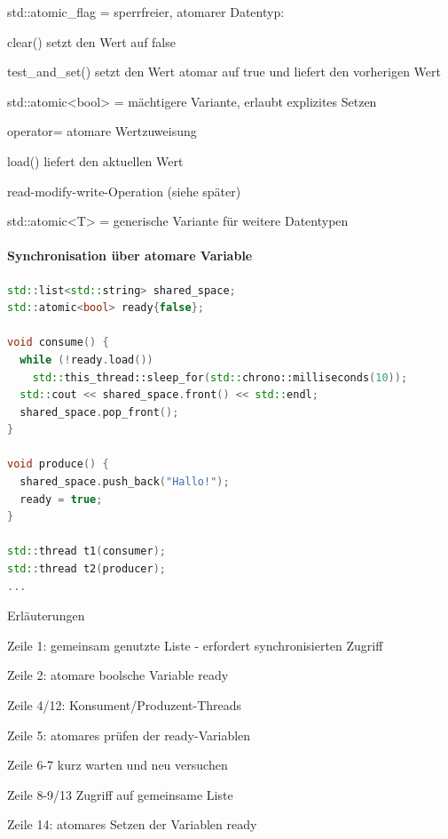 \documentclass[10pt]{article}
\begin{document}
  \begin{itemize*}
    \item std::atomic\_flag = sperrfreier, atomarer Datentyp:
    \begin{itemize*}
      \item clear() setzt den Wert auf false
      \item test\_and\_set() setzt den Wert atomar auf true und liefert den vorherigen Wert
    \end{itemize*}
    \item std::atomic<bool> = mächtigere Variante, erlaubt explizites Setzen
    \begin{itemize*}
      \item operator= atomare Wertzuweisung
      \item load() liefert den aktuellen Wert
      \item read-modify-write-Operation (siehe später)
    \end{itemize*}
    \item std::atomic<T> = generische Variante für weitere Datentypen
  \end{itemize*}
  
  
  \paragraph{Synchronisation über atomare Variable}
  
  \begin{lstlisting}[language=C++]
std::list<std::string> shared_space;
std::atomic<bool> ready{false};

void consume() {
  while (!ready.load())
    std::this_thread::sleep_for(std::chrono::milliseconds(10));
  std::cout << shared_space.front() << std::endl;
  shared_space.pop_front();
}

void produce() {
  shared_space.push_back("Hallo!");
  ready = true;
}

std::thread t1(consumer);
std::thread t2(producer);
...
\end{lstlisting}
  Erläuterungen
  \begin{itemize*}
    \item Zeile 1: gemeinsam genutzte Liste - erfordert synchronisierten Zugriff
    \item Zeile 2: atomare boolsche Variable ready
    \item Zeile 4/12: Konsument/Produzent-Threads
    \item Zeile 5: atomares prüfen der ready-Variablen
    \item Zeile 6-7 kurz warten und neu versuchen
    \item Zeile 8-9/13 Zugriff auf gemeinsame Liste
    \item Zeile 14: atomares Setzen der Variablen ready
  \end{itemize*}
  
\end{document}
